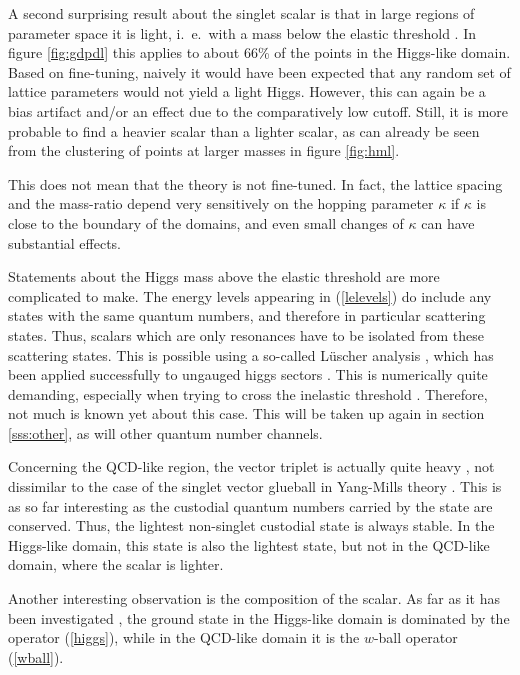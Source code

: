 \documentclass[final,12pt,3p,longtitle]{elsarticle}
\newcommand*{\pref}[1]{(\ref{#1})}
\newcommand*{\1}{1\!\!\!\bot}
\begin{document}
A second surprising result about the singlet scalar is that in large regions of parameter space it is light, i.\ e.\ with a mass below the elastic threshold \cite{Wurtz:2013ova,Maas:2013aia,Maas:2014pba,Maas:2012tj,Evertz:1986vp,Evertz:1985fc,Langguth:1985eu,Langguth:1985dr}. In figure \ref{fig:gdpdl} this applies to about 66\% of the points in the Higgs-like domain. Based on fine-tuning, naively it would have been expected that any random set of lattice parameters would not yield a light Higgs. However, this can again be a bias artifact and/or an effect due to the comparatively low cutoff. Still, it is more probable to find a heavier scalar than a lighter scalar, as can already be seen from the clustering of points at larger masses in figure \ref{fig:hml}.

This does not mean that the theory is not fine-tuned. In fact, the lattice spacing and the mass-ratio depend very sensitively on the hopping parameter $\kappa$ if $\kappa$ is close to the boundary of the domains, and even small changes of $\kappa$ can have substantial effects.

Statements about the Higgs mass above the elastic threshold are more complicated to make. The energy levels appearing in \pref{lelevels} do include any states with the same quantum numbers, and therefore in particular scattering states. Thus, scalars which are only resonances have to be isolated from these scattering states. This is possible using a so-called L\"uscher analysis \cite{Gattringer:2010zz,Luscher:1990ux,Luscher:1991cf}, which has been applied successfully to ungauged higgs sectors \cite{Zimmermann:1991xx,Gerhold:2011mx}. This is numerically quite demanding, especially when trying to cross the inelastic threshold \cite{Briceno:2014oea,Briceno:2017tce}. Therefore, not much is known yet about this case. This will be taken up again in section \ref{sss:other}, as will other quantum number channels.

Concerning the QCD-like region, the vector triplet is actually quite heavy \cite{Maas:2014pba,Evertz:1986vp,Evertz:1985fc,Langguth:1985eu,Langguth:1985dr,Maas:unpublished}, not dissimilar to the case of the singlet vector glueball in Yang-Mills theory \cite{Mathieu:2008me}. This is as so far interesting as the custodial quantum numbers carried by the state are conserved. Thus, the lightest non-singlet custodial state is always stable. In the Higgs-like domain, this state is also the lightest state, but not in the QCD-like domain, where the scalar is lighter.

Another interesting observation is the composition of the scalar. As far as it has been investigated \cite{Maas:2014pba,Wurtz:2013ova}, the ground state in the Higgs-like domain is dominated by the operator \pref{higgs}, while in the QCD-like domain it is the $w$-ball operator \pref{wball}.
\end{document}
